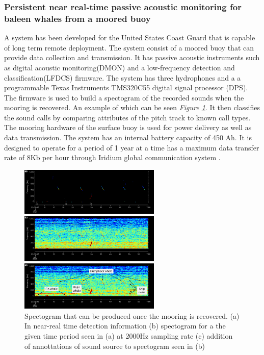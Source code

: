 
\subsubsection{Persistent near real‐time passive acoustic monitoring for baleen whales from a moored buoy }
A system has been developed for the United States Coast Guard that is capable of long term remote deployment. 
The system consist of a moored buoy that can provide data collection and transmission.
It has passive acoustic instruments such as digital acoustic monitoring(DMON) and a low-frequency detection and classification(LFDCS) firmware.
The system has three hydrophones and a a programmable Texas Instruments TMS320C55 digital signal processor (DPS).
The firmware is used to build a spectogram of the recorded sounds when the mooring is recovered.
An example of which can be seen \textit{Figure \ref{fig:SpectoExamp}}.
It then classifies the sound calls by comparing attributes of the pitch track to known call types. 
The mooring hardware of the surface buoy is used for power delivery as well as data transmission. 
The system has an internal battery capacity of 450 Ah. 
It is designed to operate for a period of 1 year at a time has a maximum data transfer rate of 8Kb per hour through Iridium global communication system \cite{baumgartner_persistent_2019}.

\begin{figure}[h]
    \centering
    \includegraphics[width=0.60\textwidth]{graphics/spectogram.png}
    \caption{Spectogram that can be produced once the mooring is recovered.
    (a) In near-real time detection information (b) spectogram for a the given time period seen in (a) at 2000Hz sampling rate (c) addition of annottations of sound source to spectogram seen in (b)\cite{baumgartner_persistent_2019}}
    \label{fig:SpectoExamp}
\end{figure}

